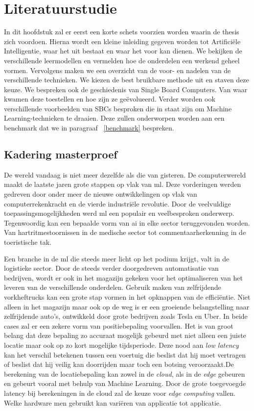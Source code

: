 \chapter{Literatuurstudie}

In dit hoofdstuk zal er eerst een korte schets voorzien worden waarin de thesis zich voordoen. Hierna wordt een kleine inleiding gegeven worden tot Artifici\"ele Intelligentie, waar het uit bestaat en waar het voor kan dienen. We bekijken de verschillende leermodellen en vermelden hoe de onderdelen een werkend geheel vormen.  Vervolgens maken we een overzicht van de voor- en nadelen van de verschillende technieken. We kiezen de best bruikbare methode uit en staven deze keuze. We bespreken ook de geschiedenis van Single Board Computers. Van waar kwamen deze toestellen en hoe zijn ze ge\"evolueerd. Verder worden ook verschillende voorbeelden van SBCs besproken die in staat zijn om Machine Learning-technieken te draaien. Deze zullen onderworpen worden aan een benchmark dat we in paragraaf ~\ref{benchmark} bespreken.

\newpage

\section{Kadering masterproef}

De wereld vandaag is niet meer dezelfde als die van gisteren.  De computerwereld maakt de laatste jaren grote stappen op vlak van \gls{ml}. Deze vorderingen werden gedreven door onder meer de nieuwe ontwikkelingen op vlak van computerrekenkracht en de vierde industriële revolutie. Door de veelvuldige toepassingsmogelijkheden werd \gls{ml} een populair en veelbesproken onderwerp. Tegenwoordig kan een bepaalde vorm van \gls{ai} in elke sector teruggevonden worden. Van hartritmestoornissen in de medische sector tot commentaarherkenning in de toeristische tak. 

Een branche in de \gls{ml} die steeds meer licht op het podium krijgt, valt in de logistieke sector. Door de steeds verder doorgedreven automatisatie van bedrijven, wordt er ook in het magazijn gekeken voor het optimaliseren van het leveren van de verschillende onderdelen. Gebruik maken van zelfrijdende vorkheftrucks kan een grote stap vormen in het opknappen van de effici\"entie. Niet alleen in het magazijn maar ook op de weg is er een groeiende belangstelling naar zelfrijdende auto's, ontwikkeld door grote bedrijven zoals Tesla en Uber. In beide cases zal er een zekere vorm van positiebepaling voorvallen. Het is van groot belang dat deze bepaling zo accuraat mogelijk gebeurd met niet alleen een juiste locatie maar ook op zo kort mogelijke tijdsperiode. Deze nood aan \textit{low latency} kan het verschil betekenen tussen een voertuig die beslist dat hij moet vertragen of beslist dat hij veilig kan doorrijden maar toch een botsing veroorzaakt.De berekening van de locatiebepaling kan zowel in de \textit{cloud}, als in de \textit{edge} gebeuren en gebeurt vooral met behulp van Machine Learning. Door de grote toegevoegde latency bij berekeningen in de cloud zal de keuze voor \textit{edge computing} vallen. Welke hardware men gebruikt kan vari\"eren van applicatie tot applicatie.

